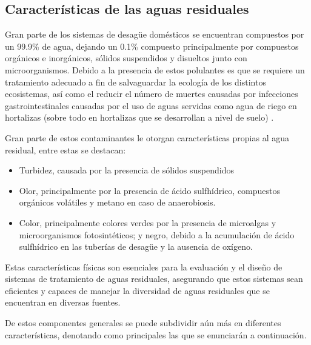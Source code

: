 \subsection{Características de las aguas residuales}
Gran parte de los sistemas de desagüe domésticos se encuentran compuestos por un 99.9\% de agua, dejando un 0.1\% compuesto principalmente por compuestos orgánicos e inorgánicos, sólidos suspendidos y disueltos junto con microorganismos. Debido a la presencia de estos polulantes es que se requiere un tratamiento adecuado a fin de salvaguardar la ecología de los distintos ecosistemas, así como el reducir el número de muertes causadas por infecciones gastrointestinales causadas por el uso de aguas servidas como agua de riego en hortalizas (sobre todo en hortalizas que se desarrollan a nivel de suelo) \citep{Sperling2007}.\par
Gran parte de estos contaminantes le otorgan características propias al agua residual, entre estas se destacan:
	\begin{itemize}
		\item Turbidez, causada por la presencia de sólidos suspendidos 
		\item Olor, principalmente por la presencia de ácido sulfhídrico, compuestos orgánicos volátiles y metano en caso de anaerobiosis.
		\item Color, principalmente colores verdes por la presencia de microalgas y microorganismos fotosintéticos; y negro, debido a la acumulación de ácido sulfhídrico en las tuberías de desagüe y la ausencia de oxígeno.
	\end{itemize}
Estas características físicas son esenciales para la evaluación y el diseño de sistemas de tratamiento de aguas residuales, asegurando que estos sistemas sean eficientes y capaces de manejar la diversidad de aguas residuales que se encuentran en diversas fuentes.\par
De estos componentes generales se puede subdividir aún más en diferentes características, denotando como principales las que se enunciarán a continuación.\par
